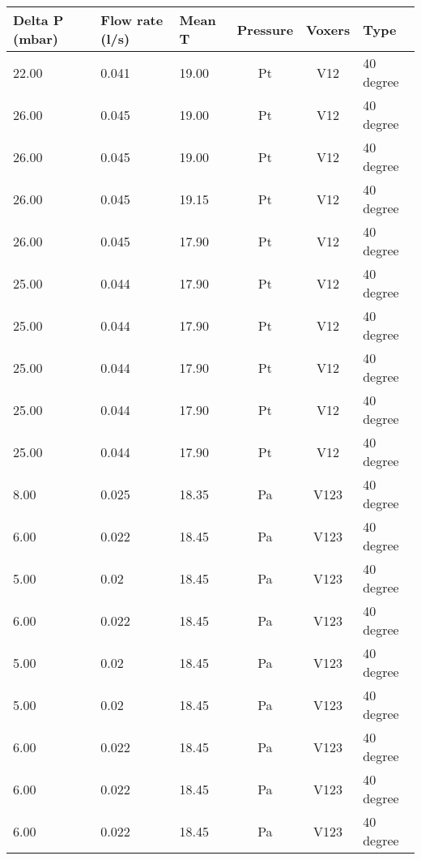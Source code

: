 \begin{table}[t]
\centering
\begin{tabular}{l | l | l | c | c | l}
Delta P (mbar) & Flow rate (l/s) & Mean T & Pressure & Voxers & Type                \\ \hline
22.00          & 0.041           & 19.00  & Pt       & V12    & 40 degree           \\
26.00          & 0.045           & 19.00  & Pt       & V12    & 40 degree           \\
26.00          & 0.045           & 19.00  & Pt       & V12    & 40 degree           \\
26.00          & 0.045           & 19.15  & Pt       & V12    & 40 degree           \\
26.00          & 0.045           & 17.90  & Pt       & V12    & 40 degree           \\
25.00          & 0.044           & 17.90  & Pt       & V12    & 40 degree           \\
25.00          & 0.044           & 17.90  & Pt       & V12    & 40 degree           \\
25.00          & 0.044           & 17.90  & Pt       & V12    & 40 degree           \\
25.00          & 0.044           & 17.90  & Pt       & V12    & 40 degree           \\
25.00          & 0.044           & 17.90  & Pt       & V12    & 40 degree           \\
8.00           & 0.025           & 18.35  & Pa       & V123   & 40 degree           \\
6.00           & 0.022           & 18.45  & Pa       & V123   & 40 degree           \\
5.00           & 0.02            & 18.45  & Pa       & V123   & 40 degree           \\
6.00           & 0.022           & 18.45  & Pa       & V123   & 40 degree           \\
5.00           & 0.02            & 18.45  & Pa       & V123   & 40 degree           \\
5.00           & 0.02            & 18.45  & Pa       & V123   & 40 degree           \\
6.00           & 0.022           & 18.45  & Pa       & V123   & 40 degree           \\
6.00           & 0.022           & 18.45  & Pa       & V123   & 40 degree           \\
6.00           & 0.022           & 18.45  & Pa       & V123   & 40 degree           \\

\end{tabular}
\end{table}
